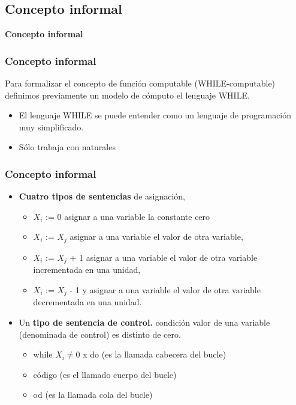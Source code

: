 \documentclass[xcolor=table]{beamer}
\begin{document}
\subsection{Concepto informal}
\begin{frame}  \Large

\begin{center}
    \textbf{Concepto informal}
\end{center}

\end{frame} 
\begin{frame}[fragile]\frametitle{Concepto informal} \small  
Para formalizar el concepto de función computable (WHILE-computable) definimos previamente un modelo de cómputo el lenguaje WHILE.

\begin{itemize}
    \item El lenguaje WHILE se puede entender como un lenguaje de programación muy simplificado.

    \item Sólo trabaja con naturales
    
\end{itemize}
\end{frame}

\begin{frame}[fragile]\frametitle{Concepto informal} \small  

\begin{itemize}
    \item \textbf{Cuatro tipos de sentencias} de asignación,
        \begin{itemize}
        \item ${X_i}$ := 0 asignar a una variable la constante cero
        \item ${X_i}$ := ${X_j}$ asignar a una variable el valor de otra variable,
        \item ${X_i}$ := ${X_j}$ + 1 asignar a una variable el valor de otra variable incrementada en una unidad,
        \item ${X_i}$ := ${X_j}$ - 1 y asignar a una variable el valor de otra variable decrementada en una unidad.
        \end{itemize}

  \item Un \textbf{tipo de sentencia de control.} condición valor de una variable (denominada de control) es distinto de cero.
        \begin{itemize}
            \item while $X_i \neq 0$ x do (es la llamada cabecera del bucle)
            \item código (es el llamado cuerpo del bucle)
            \item od (es la llamada cola del bucle)
        \end{itemize}

\end{itemize}
\end{frame}
\end{document}
